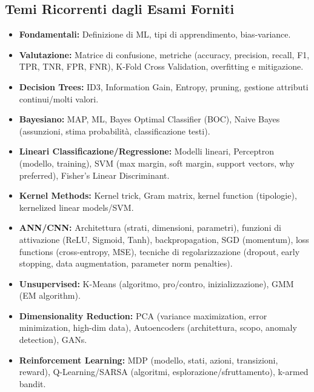 \documentclass[a4paper,11pt]{article}
\begin{document}
\subsection{Temi Ricorrenti dagli Esami Forniti}
\begin{itemize}
    \item \textbf{Fondamentali:} Definizione di ML, tipi di apprendimento, bias-variance.
    \item \textbf{Valutazione:} Matrice di confusione, metriche (accuracy, precision, recall, F1, TPR, TNR, FPR, FNR), K-Fold Cross Validation, overfitting e mitigazione.
    \item \textbf{Decision Trees:} ID3, Information Gain, Entropy, pruning, gestione attributi continui/molti valori.
    \item \textbf{Bayesiano:} MAP, ML, Bayes Optimal Classifier (BOC), Naive Bayes (assunzioni, stima probabilità, classificazione testi).
    \item \textbf{Lineari Classificazione/Regressione:} Modelli lineari, Perceptron (modello, training), SVM (max margin, soft margin, support vectors, why preferred), Fisher's Linear Discriminant.
    \item \textbf{Kernel Methods:} Kernel trick, Gram matrix, kernel function (tipologie), kernelized linear models/SVM.
    \item \textbf{ANN/CNN:} Architettura (strati, dimensioni, parametri), funzioni di attivazione (ReLU, Sigmoid, Tanh), backpropagation, SGD (momentum), loss functions (cross-entropy, MSE), tecniche di regolarizzazione (dropout, early stopping, data augmentation, parameter norm penalties).
    \item \textbf{Unsupervised:} K-Means (algoritmo, pro/contro, inizializzazione), GMM (EM algorithm).
    \item \textbf{Dimensionality Reduction:} PCA (variance maximization, error minimization, high-dim data), Autoencoders (architettura, scopo, anomaly detection), GANs.
    \item \textbf{Reinforcement Learning:} MDP (modello, stati, azioni, transizioni, reward), Q-Learning/SARSA (algoritmi, esplorazione/sfruttamento), k-armed bandit.
\end{itemize}
\end{document}

